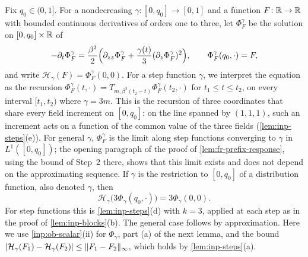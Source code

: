 Fix $q_0\in(0,1]$. For a nondecreasing $\gamma\colon[0,q_0]\to[0,1]$ and a function $F\colon\mathbb R\to\mathbb R$ with bounded continuous derivatives of orders one to three, let $\Phi^\gamma_F$ be the solution on $[0,q_0]\times\mathbb R$ of
\begin{equation}\label{eq:fr-prefix-pde}
 -\partial_t\Phi^\gamma_F=\frac{\beta^2}2\Bigl(\partial_{zz}\Phi^\gamma_F+\frac{\gamma(t)}3(\partial_z\Phi^\gamma_F)^2\Bigr),\qquad
 \Phi^\gamma_F(q_0,\cdot)=F,
\end{equation}
and write $\mathcal H_\gamma(F)=\Phi^\gamma_F(0,0)$. For a step function $\gamma$, we interpret the equation as the recursion $\Phi^\gamma_F(t,\cdot)=T_{m,\beta^2(t_2-t)}\Phi^\gamma_F(t_2,\cdot)$ for $t_1\le t\le t_2$, on every interval $[t_1,t_2)$ where $\gamma=3m$. This is the recursion of three coordinates that share every field increment on $[0,q_0]$: on the line spanned by $(1,1,1)$, such an increment acts on a function of the common value of the three fields (\cref{lem:inp-steps}(e)). For general $\gamma$, $\Phi^\gamma_F$ is the limit along step functions converging to $\gamma$ in $L^1([0,q_0])$; the opening paragraph of the proof of \cref{lem:fr-prefix-response}, using the bound of Step~2 there, shows that this limit exists and does not depend on the approximating sequence. If $\gamma$ is the restriction to $[0,q_0]$ of a distribution function, also denoted $\gamma$, then
\begin{equation}\label{eq:fr-block}
 \mathcal H_\gamma\bigl(3\Phi_\gamma(q_0,\cdot)\bigr)=3\Phi_\gamma(0,0).
\end{equation}
For step functions this is \cref{lem:inp-steps}(d) with $k=3$, applied at each step as in the proof of \cref{lem:inp-blocks}(b). The general case follows by approximation. Here we use \cref{inp:ob-scalar}(ii) for $\Phi_\gamma$, part (a) of the next lemma, and the bound $\lvert \mathcal H_\gamma(F_1)-\mathcal H_\gamma(F_2)\rvert\le\lVert F_1-F_2\rVert_\infty$, which holds by \cref{lem:inp-steps}(a).


